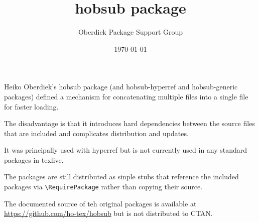 \documentclass{article}
\title{hobsub package}
\author{Oberdiek Package Support Group}
\date{\today}
\begin{document}
\maketitle

Heiko Oberdiek's \textsf{hobsub} package (and \textsf{hobsub-hyperref}
and \textsf{hobsub-generic} packages) defined a mechanism for
concatenating multiple files into a single file for faster loading.

The disadvantage is that it introduces hard dependencies between the
source files that are included and complicates distribution and
updates.

It was principally used with \textsf{hyperref} but is not currently
used in any standard packages in texlive.

The packages are still distributed as sinple stubs that reference the
included packages via \verb|\RequirePackage|  rather than copying
their source.

The documented source of teh original packages is available at 
\url{https://github.com/ho-tex/hobsub}
but is not distributed to CTAN.
\end{document}
